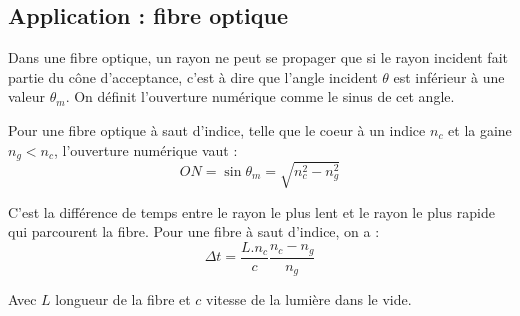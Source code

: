 \documentclass[11pt]{article}
\theoremstyle{cstyle}{\newtheorem{definition}{Définition}[section]}
\theoremstyle{cstyle}{\newtheorem{proposition}[definition]{Propriété}}
\theoremstyle{cstyle}{\newtheorem{theorem}[definition]{Théorème}}
\theoremstyle{mystyle}{\newtheorem{lemma}[definition]{Lemme}}
\theoremstyle{mystyle}{\newtheorem{corollary}[definition]{Corollaire}}
\theoremstyle{mystyle}{\newtheorem*{remark}{Remarque}}
\theoremstyle{mystyle}{\newtheorem*{remarks}{Remarques}}
\theoremstyle{mystyle}{\newtheorem*{example}{Exemple}}
\theoremstyle{mystyle}{\newtheorem*{examples}{Exemples}}
\theoremstyle{definition}{\newtheorem*{exercise}{Exercice}}
\theoremstyle{mystyle}{\newtheorem*{methode}{Méthode}}
\theoremstyle{cstyle}{\newtheorem*{cthm}{}}
\theoremstyle{warn}
\begin{document}
	\hfill
	\vrule
	\hfill
	\begin{minipage}[t]{0.45\textwidth}
		\subsection{Application : fibre optique}
		
		\begin{proposition}
			Dans une fibre optique, un rayon ne peut se propager que si le rayon incident fait partie du cône d'acceptance, c'est à dire que l'angle incident \(\theta\) est inférieur à une valeur \(\theta_m\). On définit l'ouverture numérique comme le sinus de cet angle.
			
			Pour une fibre optique à saut d'indice, telle que le coeur à un indice \(n_c\) et la gaine \(n_g < n_c\), l'ouverture numérique vaut :
			\[
				ON = \sin \theta_m = \sqrt{n_c^2 - n_g^2}
			\] 	
			
		\end{proposition}			
	
		\begin{proposition}
			C'est la différence de temps entre le rayon le plus lent et le rayon le plus rapide qui parcourent la fibre.
			Pour une fibre à saut d'indice, on a :
			\[
				\Delta t = \frac{L.n_c}{c} \frac{n_c - n_g}{n_g}
			\]
			
			Avec \(L\) longueur de la fibre et \(c\) vitesse de la lumière dans le vide.
		\end{proposition}
	\end{minipage}
\end{document}
